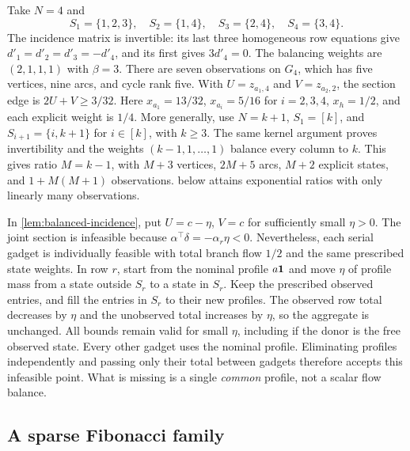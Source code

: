 \begin{example}\label{ex:small-sp}
Take $N=4$ and
\[
 S_1=\{1,2,3\},\quad S_2=\{1,4\},\quad
 S_3=\{2,4\},\quad S_4=\{3,4\}.
\]
The incidence matrix is invertible: its last three homogeneous row
equations give $d'_1=d'_2=d'_3=-d'_4$, and its first gives
$3d'_4=0$. The balancing weights are $(2,1,1,1)$ with $\beta=3$.
There are seven observations on $G_4$, which has five vertices,
nine arcs, and cycle rank five. With $U=z_{a_1,4}$ and
$V=z_{a_2,2}$, the section edge is $2U+V\ge3/32$.
Here $x_{a_1}=13/32$, $x_{a_i}=5/16$ for $i=2,3,4$,
$x_h=1/2$, and each explicit weight is $1/4$.
More generally, use $N=k+1$, $S_1=[k]$, and
$S_{i+1}=\{i,k+1\}$ for $i\in[k]$, with $k\ge3$.
The same kernel argument proves invertibility and the weights
$(k-1,1,\ldots,1)$ balance every column to $k$. This gives ratio
$M=k-1$, with $M+3$ vertices, $2M+5$ arcs, $M+2$ explicit
states, and $1+M(M+1)$ observations.  below attains
exponential ratios with only linearly many observations.
\end{example}

\begin{remark}\label{rem:scalar-failure}
In \cref{lem:balanced-incidence}, put $U=c-\eta$, $V=c$ for
sufficiently small $\eta>0$. The joint section is infeasible because
$\alpha^\top\delta=-\alpha_r\eta<0$. Nevertheless, each serial
gadget is individually feasible with total branch flow $1/2$ and
the same prescribed state weights. In row $r$, start from the nominal
profile $a\mathbf 1$ and move $\eta$ of profile mass from a state outside
$S_r$ to a state in $S_r$. Keep the prescribed observed entries,
and fill the entries in $S_r$ to their new profiles. The observed
row total decreases by $\eta$ and the unobserved total increases
by $\eta$, so the aggregate is unchanged. All bounds remain valid
for small $\eta$, including if the donor is the free observed state.
Every other gadget uses the nominal profile. Eliminating profiles
independently and passing only their total between gadgets therefore
accepts this infeasible point. What is missing is a single
\emph{common} profile, not a scalar flow balance.
\end{remark}

\subsection{A sparse Fibonacci family}

